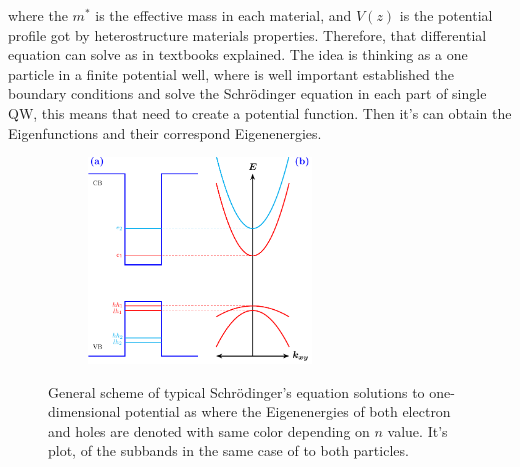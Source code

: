 where the $m^{*}$ is the effective mass in each material, and $V(z)$ is the potential profile got by heterostructure materials properties. Therefore, that differential equation can solve as in textbooks explained\cite{de2014introduccion,griffiths2018introduction,sakurai1995modern,cohen2019quantum,chuang1995physics,harrison2016quantum,fox2002optical,bastard1990wave}. The idea is thinking as a one particle in a finite potential well, where is well important established the boundary conditions and solve the Schrödinger equation in each part of single QW, this means that need to create a potential function. Then it's can obtain the Eigenfunctions and their correspond Eigenenergies.

\begin{figure}
	\begin{subfigure}{\textwidth}
		\centering
		\includegraphics[width=0.65\textwidth]{../figures/chapter-1/heterostructures/out-ruco/qw2}
		\label{subfig:subsection-1.2-single-quantum-well-scheme2-a)}
		\label{subfig:subsection-1.2-single-quantum-well-scheme2-b)}
	\end{subfigure}
	\caption{General scheme of typical Schrödinger's equation solutions to one-dimensional potential as  where the Eigenenergies of both electron and holes are denoted with same color depending on  $n$ value. It's plot, of the subbands in  the same case of   to both particles.  }
	\label{fig:subsection-1.2-single-quantum-well-scheme2}
\end{figure}

